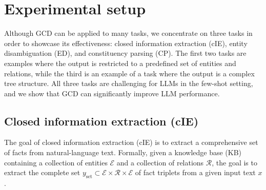 \section{Experimental setup}\label{sec:experiments}
Although GCD can be applied to many tasks, we concentrate on three tasks in order to showcase its effectiveness: closed information extraction (cIE), entity disambiguation (ED), and constituency parsing (CP).
%
The first two tasks are examples where the output is restricted to a predefined set of entities and relations, while the third is an example of a task where the output is a complex tree structure.
All three tasks are challenging for LLMs in the few-shot setting, and we show that GCD can significantly improve LLM performance.



\subsection{Closed information extraction (cIE)}

 The goal of closed information extraction (cIE) is to extract a comprehensive set of facts from natural\hyp language text. Formally, given a knowledge base (KB) containing a collection of entities $\mathcal{E}$ and a collection of relations $\mathcal{R}$, the goal is to extract the complete set $y_\text{set} \subset \mathcal{E} \times \mathcal{R} \times \mathcal{E}$ of fact triplets from a given input text $x$.


